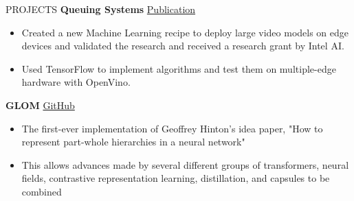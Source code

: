 \documentclass{resume} %
\begin{document}
\begin{rSection}{PROJECTS}
{\bf Queuing Systems} \hfill {\href{https://link.springer.com/article/10.1007\%2Fs00500-021-05891-2}{Publication}}
 \begin{itemize}
    \itemsep -3pt {} 
\item Created a new Machine Learning recipe to deploy large video models on edge
devices and validated the research and received a research grant by Intel AI.
\item Used TensorFlow to implement algorithms and test them on multiple-edge hardware with OpenVino.
\end{itemize}

{\bf GLOM} \hfill {\href{https://github.com/Rishit-dagli/GLOM-TensorFlow}{GitHub}}
 \begin{itemize}
    \itemsep -3pt {} 
    \item The first-ever implementation of Geoffrey Hinton's idea paper, "How to represent part-whole hierarchies in a neural network"
    \item This allows advances made by several different groups of transformers, neural fields, contrastive representation learning, distillation, and capsules to be combined
\end{itemize}
\end{rSection}
\end{document}
